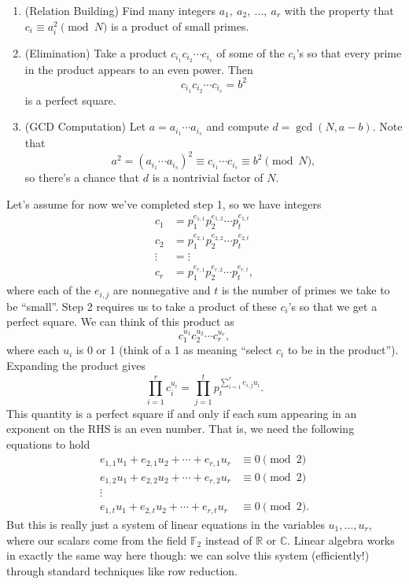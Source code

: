 \documentclass[12pt]{article}
\theoremstyle{plain}
\theoremstyle{definition}
\theoremstyle{remark}
\newcommand{\C}{\mathbb{C}}
\newcommand{\R}{\mathbb{R}}
\newcommand{\F}{\mathbb{F}}
\begin{document}
\begin{enumerate}
    \item (Relation Building) Find many integers $a_1,\ a_2,\ \ldots,\ a_r$ with the property that $c_i \equiv a_i^2 \pmod N$ is a product of small primes.

    \item (Elimination) Take a product $c_{i_1}c_{i_2}\cdots c_{i_s}$ of some of the $c_i$'s so that every prime in the product appears to an even power.
    Then
    \[
        c_{i_1}c_{i_2}\cdots c_{i_s} = b^2
    \]
    is a perfect square.

    \item (GCD Computation) Let $a = a_{i_1}\cdots a_{i_s}$ and compute $d = \gcd(N, a-b)$.
    Note that
    \[
        a^2 = (a_{i_1}\cdots a_{i_s})^2 \equiv c_{i_1}\cdots c_{i_s} \equiv b^2\pmod N,
    \]
    so there's a chance that $d$ is a nontrivial factor of $N$.
\end{enumerate}

Let's assume for now we've completed step 1, so we have integers
\begin{align*}
    c_1 &= p_1^{e_{1,1}}p_2^{e_{1,2}}\cdots p_t^{e_{1,t}}\\
    c_2 &= p_1^{e_{2,1}}p_2^{e_{2,2}}\cdots p_t^{e_{2,t}}\\
    \vdots &= \vdots\\ 
    c_r &= p_1^{e_{r,1}}p_2^{e_{r,2}}\cdots p_t^{e_{r,t}},
\end{align*}
where each of the $e_{i,j}$ are nonnegative and $t$ is the number of primes we take to be ``small''.
Step 2 requires us to take a product of these $c_i$'s so that we get a perfect square.
We can think of this product as
\[
    c_1^{u_1}c_2^{u_2}\cdots c_r^{u_r},
\]
where each $u_i$ is 0 or 1 (think of a 1 as meaning ``select $c_i$ to be in the product'').
Expanding the product gives
\[
    \prod_{i=1}^rc_i^{u_i} = \prod_{j=1}^tp_t^{\sum_{i=1}^re_{i,j}u_i}.
\]
This quantity is a perfect square if and only if each sum appearing in an exponent on the RHS is an even number.
That is, we need the following equations to hold
\begin{align*}
    e_{1,1}u_1 + e_{2,1}u_2 + \cdots + e_{r,1}u_r &\equiv 0\pmod 2\\
    e_{1,2}u_1 + e_{2,2}u_2 + \cdots + e_{r,2}u_r &\equiv 0\pmod 2\\
    \vdots\\
    e_{1,t}u_1 + e_{2,t}u_2 + \cdots + e_{r,t}u_r &\equiv 0\pmod 2.
\end{align*}
But this is really just a system of linear equations in the variables $u_1, \ldots, u_r$, where our scalars come from the field $\F_2$ instead of $\R$ or $\C$.
Linear algebra works in exactly the same way here though: we can solve this system (efficiently!) through standard techniques like row reduction.
\end{document}
